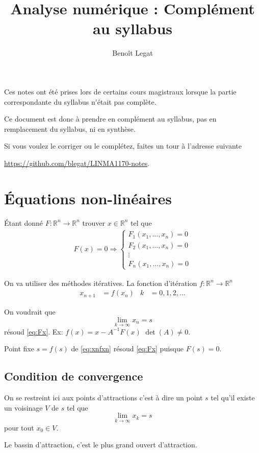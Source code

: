 \documentclass[11pt,a4paper]{article}
\title{Analyse numérique : Complément au syllabus}
\author{Beno\^it Legat}
\newcommand{\R}{\mathbb{R}}
\newcommand{\Rn}{\R^n}
\theoremstyle{definition}
\begin{document}
\maketitle

Ces notes ont été prises lors de certains cours magistraux
lorsque la partie correspondante du syllabus n'était pas complète.

Ce document est donc à prendre en complément au syllabus,
pas en remplacement du syllabus, ni en synthèse.

Si vous voulez le corriger ou le complétez,
faites un tour à l'adresse suivante
\begin{center}
  \url{https://github.com/blegat/LINMA1170-notes}.
\end{center}

\section{Équations non-linéaires}
Étant donné $F: \Rn \to \Rn$ trouver $x \in \Rn$ tel que
\begin{align}
  \label{eq:Fx}
  F(x) = 0 \Rightarrow \begin{cases}
    F_1(x_1,\ldots,x_n) = 0\\
    F_2(x_1,\ldots,x_n) = 0\\
    \vdots\\
    F_n(x_1,\ldots,x_n) = 0
  \end{cases}
\end{align}

On va utiliser des méthodes itératives.
La fonction d'itération $f: \Rn\to\Rn$
\begin{align}
  \label{eq:xnfxn}
  x_{n+1} & = f(x_n) & k & = 0,1,2,\ldots
\end{align}

On voudrait que
$$\lim_{k\to\infty} x_n = s$$
résoud \eqref{eq:Fx}.
Ex: $f(x) = x - A^{-1}F(x)$ $\det(A) \neq 0$.

Point fixe $s = f(s)$ de \eqref{eq:xnfxn} résoud
\eqref{eq:Fx} puisque $F(s) = 0$.

\subsection{Condition de convergence}
On se restreint ici aux points d'attractions c'est à dire un point
$s$ tel qu'il existe un voisinage $V$ de $s$ tel que
$$\lim_{k\to\infty} x_k = s$$
pour tout $x_0 \in V$.

Le bassin d'attraction, c'est le plus grand ouvert d'attraction.
\end{document}
